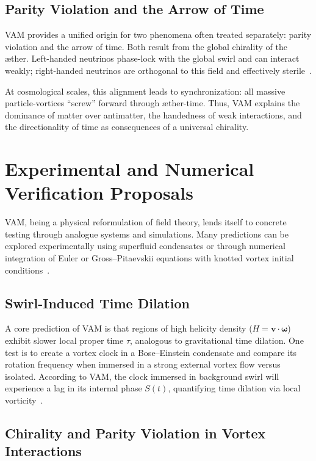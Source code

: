 \subsection*{Parity Violation and the Arrow of Time}

VAM provides a unified origin for two phenomena often treated separately: parity violation and the arrow of time. Both result from the global chirality of the æther. Left-handed neutrinos phase-lock with the global swirl and can interact weakly; right-handed neutrinos are orthogonal to this field and effectively sterile~\cite{iskandarani2025vam5}.

At cosmological scales, this alignment leads to synchronization: all massive particle-vortices “screw” forward through æther-time. Thus, VAM explains the dominance of matter over antimatter, the handedness of weak interactions, and the directionality of time as consequences of a universal chirality.

\bigskip

\section*{Experimental and Numerical Verification Proposals}

VAM, being a physical reformulation of field theory, lends itself to concrete testing through analogue systems and simulations. Many predictions can be explored experimentally using superfluid condensates or through numerical integration of Euler or Gross–Pitaevskii equations with knotted vortex initial conditions~\cite{iskandarani2025vam5}.

\subsection*{Swirl-Induced Time Dilation}

A core prediction of VAM is that regions of high helicity density ($H = \mathbf{v} \cdot \boldsymbol{\omega}$) exhibit slower local proper time $\tau$, analogous to gravitational time dilation. One test is to create a vortex clock in a Bose–Einstein condensate and compare its rotation frequency when immersed in a strong external vortex flow versus isolated. According to VAM, the clock immersed in background swirl will experience a lag in its internal phase $S(t)$, quantifying time dilation via local vorticity~\cite{iskandarani2025vam5}.

\subsection*{Chirality and Parity Violation in Vortex Interactions}

